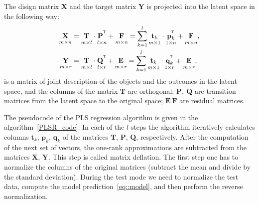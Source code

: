 \documentclass[12pt,twoside]{article}
\newcommand{\bY}{\mathbf{Y}}
\newcommand{\bX}{\mathbf{X}}
\newcommand{\bt}{\mathbf{t}}
\newcommand{\bp}{\mathbf{p}}
\newcommand{\bq}{\mathbf{q}}
\newcommand{\bP}{\mathbf{P}}
\newcommand{\bT}{\mathbf{T}}
\newcommand{\bQ}{\mathbf{Q}}
\newcommand{\bE}{\mathbf{E}}
\newcommand{\bF}{\mathbf{F}}
\newcommand{\T}{^{\text{\tiny\sffamily\upshape\mdseries T}}}
\begin{document}
The disign matrix $\bX$ and the target matrix $\bY$ is projected into the latent space in the following way:
\begin{align}
\label{eq::PLS_X}
 \underset{m \times n}{\vphantom{\bQ}\bX} 
 &= \underset{m \times l}{\vphantom{\bQ}\bT} \cdot \underset{l \times n}{\vphantom{\bQ}\bP^{\T}} + \underset{m \times n}{\vphantom{\bQ}\bF} 
 = \sum_{k=1}^l \underset{m \times 1}{\vphantom{\bp_k^{\T}}\bt_k} \cdot \underset{1 \times n}{\bp_k^{\T}} + \underset{m \times n}{\vphantom{\bp_k^{\T}}\bF},\\
 \label{eq::PLS_Y}
 \underset{m \times r}{\vphantom{\bQ}\bY} 
 &= \underset{m \times l}{\vphantom{\bQ}\bT} \cdot \underset{l \times r}{\bQ^{\T}} + \underset{m \times r}{\vphantom{\bQ}\bE}
 =  \sum_{k=1}^l  \underset{m \times 1}{\vphantom{\bq_k^{\T}}\bt_k} \cdot \underset{1 \times r}{\bq_k^{\T}} +  \underset{m \times r}{\vphantom{\bq_k^{\T}}\bE},
\end{align}
is a matrix of joint description of the objects and the outcomes in the latent space, and the columns of the matrix $\bT$ are orthogonal; $\bP,\ \bQ$ are transition matrices from the latent space to the original space; $\bE\ \bF$ are residual matrices.

The pseudocode of the PLS regression algorithm is given in the algorithm~\ref{PLSR_code}.
In each of the $l$ steps the algorithm iteratively calculates columns $\bt_k$, $\bp_k$, $\bq_k$ of the matrices $\bT$, $\bP$, $\bQ$, respectively. 
After the computation of the next set of vectors, the one-rank approximations are subtracted from the matrices $\bX$, $\bY$. This step is called matrix deflation.
The first step one has to normalize the columns of the original matrices (subtract the mean and divide by the standard deviation).
During the test mode we need to normalize the test data, compute the model prediction~\eqref{eq::model}, and then perform the reverse normalization.
\end{document}
